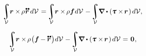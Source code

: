 \begin{otherlanguage}{russian}
\nopagebreak\vspace{-0.2em}\begin{equation*}
\integral\displaylimits_{\mathcal{V}} \hspace{-0.5ex} \currentlocationvector \times \hspace{-0.2ex} \rho \hspace{.1ex} \mathdotdotabove{\currentlocationvector} \hspace{.4ex} d\mathcal{V} \hspace{.22ex}
= \hspace{-0.2ex} \integral\displaylimits_{\mathcal{V}} \hspace{-0.5ex} \currentlocationvector \times \hspace{-0.2ex} \rho \bm{f} \hspace{0.1ex} d\mathcal{V} \hspace{.2ex}
- \hspace{-0.2ex} \integral\displaylimits_{\mathcal{V}} \hspace{-0.5ex} \boldnabla \dotp \left( \cauchystress \times \hspace{-0.24ex} \currentlocationvector \hspace{.2ex} \right) \hspace{-0.1ex} d\mathcal{V} ,
\end{equation*}

\nopagebreak\vspace{-0.2em}\begin{equation*}
\integral\displaylimits_{\mathcal{V}} \hspace{-0.5ex} \currentlocationvector \times \hspace{-0.2ex} \rho \hspace{.15ex} \bigl( \bm{f} \hspace{-0.1ex} - \hspace{-0.1ex} \mathdotdotabove{\currentlocationvector} \hspace{.2ex} \bigr) \hspace{.1ex} d\mathcal{V} \hspace{.12ex}
- \hspace{-0.2ex} \integral\displaylimits_{\mathcal{V}} \hspace{-0.5ex} \boldnabla \dotp \left( \cauchystress \times \hspace{-0.24ex} \currentlocationvector \hspace{.2ex} \right) \hspace{-0.1ex} d\mathcal{V} \hspace{.1ex}
= \hspace{.15ex} \bm{0}
\hspace{.1ex} ,
\end{equation*}


\end{otherlanguage}
